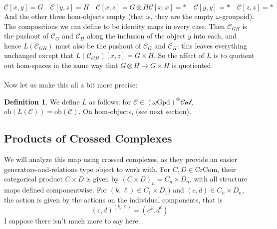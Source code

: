 \documentclass[12pt]{article}
\theoremstyle{definition}
\newtheorem{definition}[theorem]{Definition}
\newcommand{\C}{\mathcal{C}}
\newcommand{\stinfty}{\omega\text{Gpd}}
\newcommand{\crcom}{\text{CrCom}}
\newcommand{\graycatzero}{(\stinfty)^\otimes\mathcal{Cat}}
\newcommand{\ob}{\text{ob}}
\newcommand{\forcecartesian}{L}
\begin{document}
		$$\C[x,y] = G \quad \C[y,z] = H \quad \C[x,z] = G \otimes H \C[x,x] = * \quad \C[y,y] = * \quad \C[z,z] = *$$
		And the other three hom-objects empty (that is, they are the empty $\omega$-groupoid). The compositions we can define to be identity maps in every case. Then $\C_{GH}$ is the pushout of $\C_G$ and $\C_H$ along the inclusion of the object $y$ into each, and hence $\forcecartesian(\C_{GH})$ must also be the pushout of $\C_G$ and $\C_H$: this leaves everything unchanged except that $\forcecartesian(\C_{GH})[x,z] = G \times H$. 
		So the affect of $\forcecartesian$ is to quotient out hom-spaces in the same way that $G \otimes H \to G \times H$ is quotiented. 
		\\\\
		Now let us make this all a bit more precise:
		\begin{definition}
			We define $\forcecartesian$ as follows: for $\C \in \graycatzero,$ $\ob(\forcecartesian(\C)) = \ob(\C)$. On hom-objects, (see next section).
		\end{definition}
\subsection{Products of Crossed Complexes}
		We will analyze this map using crossed complexes, as they provide an easier generators-and-relations type object to work with. For $C,D \in \crcom$, their categorical product $C \times D$ is given by $(C \times D)_n = C_n \times D_n$, with all structure maps defined componentwise. For $(k,\ell) \in C_1 \times D_1)$ and $(c,d) \in C_n \times D_n$, the action is given by the actions on the individual components, that is
	$$(c,d)^{(k,\ell)} = (c^k,d^\ell)$$
I suppose there isn't much more to say here...
\end{document}

